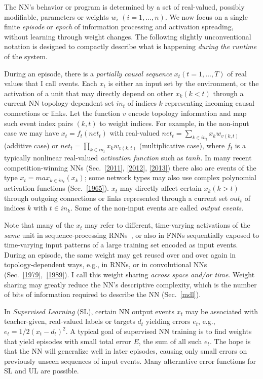 \documentclass[letterpaper]{article}
\begin{document}
The NN's behavior or program is determined by a set of real-valued, possibly modifiable,
parameters or weights 
$w_i$ $(i=1,\ldots,n)$.
We now focus on a single finite {\em episode} or {\em epoch} of information processing 
and activation spreading, without learning through weight changes.
The following slightly unconventional 
notation is designed to compactly describe what is happening
 {\em during the runtime} of the system. 


During an episode, 
there is a {\em partially causal sequence}  
$x_t (t=1,\ldots,T)$ of real values that I call events.
Each $x_t$ is either an input set by the environment, 
or the activation of a unit 
that may directly depend on other $x_k (k<t)$ through a current 
NN topology-dependent 
set $in_t$ of indices $k$ representing incoming causal connections or links.
Let the function $v$ encode topology information and map such event index pairs $(k,t)$ to weight indices.
For example, in the non-input case we may have 
$x_t=f_t(net_t)$ 
with real-valued 
$net_t=\sum_{k \in in_t} x_k w_{v(k,t)}$ (additive case)
or $net_t=\prod_{k \in in_t} x_k w_{v(k,t)}$ (multiplicative case),
where $f_t$ is a typically nonlinear real-valued {\em activation function}
such as $tanh$.
In many recent competition-winning NNs 
(Sec.~\ref{2011}, \ref{2012}, \ref{2013})
there also are  events of the type $x_t=max_{k \in in_t}(x_k)$;
some network types may also use complex polynomial activation functions (Sec.~\ref{1965}).
$x_t$ may directly affect certain  $x_k (k>t)$ through outgoing connections or links 
represented through a current 
set $out_t$ of indices $k$ with $t \in in_k$.
Some of the non-input events are called {\em output events}.

Note that many of the $x_t$ may refer to different, time-varying activations of the {\em same} unit
in sequence-processing RNNs~\citep[e.g.,][{\em ``unfolding in time"}]{Williams:89},
or also in FNNs sequentially exposed to time-varying input patterns of a large training set 
encoded as input events.
During an episode, the same weight may get reused over and over again
in topology-dependent ways, e.g., in RNNs, or in convolutional NNs
(Sec.~\ref{1979},~\ref{1989}).
I call this weight sharing {\em across space and/or time}.
Weight sharing may greatly reduce the NN's descriptive complexity, which is the number of bits of information 
required to describe the NN (Sec.~\ref{mdl}). 


In {\em Supervised Learning} (SL), 
certain NN output events $x_t$  may be associated with teacher-given, real-valued labels or targets $d_t$ 
yielding errors $e_t$, e.g., $e_t=1/2(x_t-d_t)^2$.
A typical goal of supervised NN training is to find weights that 
yield episodes with small total error $E$, 
the sum of all such $e_t$. 
The hope is that the NN will generalize well in later episodes,
causing only small errors on previously unseen sequences of input events. 
Many alternative error functions for SL and UL are possible.
\end{document}
